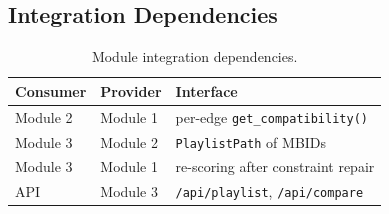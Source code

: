 \subsection{Integration Dependencies}

\begin{table}[h]
\centering
\caption{Module integration dependencies.}
\label{tab:dependencies}
\begin{tabular}{@{}lll@{}}
\toprule
\textbf{Consumer} & \textbf{Provider} & \textbf{Interface} \\
\midrule
Module 2 & Module 1 & per-edge \texttt{get\_compatibility()} \\
Module 3 & Module 2 & \texttt{PlaylistPath} of MBIDs \\
Module 3 & Module 1 & re-scoring after constraint repair \\
API & Module 3 & \texttt{/api/playlist}, \texttt{/api/compare} \\
\bottomrule
\end{tabular}
\end{table}
